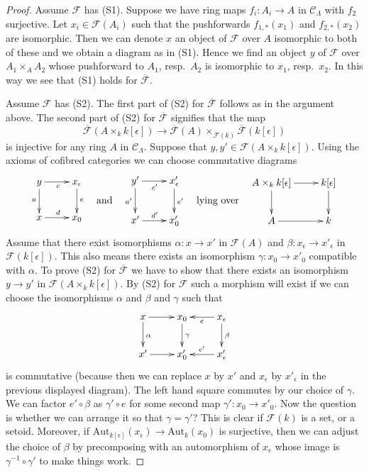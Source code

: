 \documentclass[10pt,a4paper]{amsart}
\theoremstyle{plain}
\theoremstyle{definition}
\theoremstyle{remark}
\numberwithin{equation}{subsection}
\begin{document}
\begin{proof}
Assume $\mathcal{F}$ has (S1).
Suppose we have ring maps $f_i : A_i \to A$ in $\mathcal{C}_\Lambda$
with $f_2$ surjective. Let $x_i \in \mathcal{F}(A_i)$ such that
the pushforwards $f_{1, *}(x_1)$ and $f_{2, *}(x_2)$ are isomorphic.
Then we can denote $x$ an object of $\mathcal{F}$ over $A$ isomorphic
to both of these and we obtain a diagram as in (S1). Hence we find
an object $y$ of $\mathcal{F}$ over $A_1 \times_A A_2$ whose pushforward
to $A_1$, resp.\ $A_2$ is isomorphic to $x_1$, resp.\ $x_2$. In this way
we see that (S1) holds for $\overline{\mathcal{F}}$.

\medskip\noindent
Assume $\mathcal{F}$ has (S2).
The first part of (S2) for $\overline{\mathcal{F}}$ follows as in
the argument above. The second part of (S2) for
$\overline{\mathcal{F}}$ signifies that the map
$$
\overline{\mathcal{F}}(A \times_k k[\epsilon]) \to
\overline{\mathcal{F}}(A)
\times_{\overline{\mathcal{F}}(k)} \overline{\mathcal{F}}(k[\epsilon])
$$
is injective for any ring $A$ in $\mathcal{C}_\Lambda$. Suppose that
$y, y' \in \mathcal{F}(A \times_k k[\epsilon])$. Using the axioms
of cofibred categories we can choose commutative diagrams
$$
\vcenter{
\xymatrix{
y \ar[r]_c \ar[d]_a & x_\epsilon \ar[d]^e \\
x \ar[r]^d          & x_0
}
}
\quad\text{and}\quad
\vcenter{
\xymatrix{
y' \ar[r]_{c'} \ar[d]_{a'} & x'_\epsilon \ar[d]^{e'} \\
x' \ar[r]^{d'}                 & x'_0
}
}
\quad\text{lying over}\quad
\vcenter{
\xymatrix{
A \times_k k[\epsilon] \ar[d] \ar[r] & k[\epsilon] \ar[d] \\
A \ar[r] & k
}
}
$$
Assume that there exist isomorphisms
$\alpha : x \to x'$ in $\mathcal{F}(A)$ and
$\beta : x_\epsilon \to x'_\epsilon$ in $\mathcal{F}(k[\epsilon])$.
This also means there exists an isomorphism $\gamma : x_0 \to x'_0$
compatible with $\alpha$. To prove (S2) for $\overline{\mathcal{F}}$
we have to show that there exists an isomorphism $y \to y'$ in
$\mathcal{F}(A \times_k k[\epsilon])$.
By (S2) for $\mathcal{F}$ such a morphism will exist if we can
choose the isomorphisms $\alpha$ and $\beta$ and $\gamma$ such that
$$
\xymatrix{
x \ar[d]^\alpha \ar[r] & x_0 \ar[d]^\gamma &
x_\epsilon \ar[d]^\beta \ar[l]^e \\
x' \ar[r] & x'_0 & x'_\epsilon \ar[l]_{e'}
}
$$
is commutative (because then we can replace $x$ by $x'$ and $x_\epsilon$
by $x'_\epsilon$ in the previous displayed diagram). The left hand square
commutes by our choice of $\gamma$. We can factor $e' \circ \beta$ as
$\gamma' \circ e$ for some second map
$\gamma' : x_0 \to x'_0$. Now the question is whether we can arrange it so
that $\gamma = \gamma'$? This is clear if $\mathcal{F}(k)$ is a set, or a
setoid. Moreover, if
$\text{Aut}_{k[\epsilon]}(x_\epsilon) \to \text{Aut}_k(x_0)$
is surjective, then we can adjust the choice of $\beta$ by precomposing
with an automorphism of $x_\epsilon$ whose image is
$\gamma^{-1} \circ \gamma'$ to make things work.
\end{proof}
\end{document}
